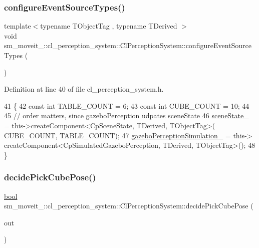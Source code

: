 \subsubsection{\texorpdfstring{configure\+Event\+Source\+Types()}{configureEventSourceTypes()}}
{\footnotesize\ttfamily template$<$typename T\+Object\+Tag , typename T\+Derived $>$ \\
void sm\+\_\+moveit\+\_\+::cl\+\_\+perception\+\_\+system\+::\+Cl\+Perception\+System\+::configure\+Event\+Source\+Types (\begin{DoxyParamCaption}{ }\end{DoxyParamCaption})\hspace{0.3cm}{\ttfamily [inline]}}



Definition at line 40 of file cl\+\_\+perception\+\_\+system.\+h.


\begin{DoxyCode}
41             \{
42                 \textcolor{keyword}{const} \textcolor{keywordtype}{int} TABLE\_COUNT = 6;
43                 \textcolor{keyword}{const} \textcolor{keywordtype}{int} CUBE\_COUNT = 10;
44 
45                 \textcolor{comment}{// order matters, since gazeboPerception udpates sceneState}
46                 \hyperlink{classsm__moveit__4_1_1cl__perception__system_1_1ClPerceptionSystem_a82ea8feeb2fa43349f91ed59137b3890}{sceneState\_} = this->createComponent<CpSceneState, TDerived, TObjectTag>(
      CUBE\_COUNT, TABLE\_COUNT);
47                 \hyperlink{classsm__moveit__4_1_1cl__perception__system_1_1ClPerceptionSystem_a027c07df3f1a2cc0c30be111b27dbe5c}{gazeboPerceptionSimulation\_} = this->
      createComponent<CpSimulatedGazeboPerception, TDerived, TObjectTag>();
48             \}
\end{DoxyCode}
\mbox{\label{classsm__moveit__4_1_1cl__perception__system_1_1ClPerceptionSystem_af1143d68db667021480383673244bb04}} 
\subsubsection{\texorpdfstring{decide\+Pick\+Cube\+Pose()}{decidePickCubePose()}}
{\footnotesize\ttfamily \hyperlink{classbool}{bool} sm\+\_\+moveit\+\_\+::cl\+\_\+perception\+\_\+system\+::\+Cl\+Perception\+System\+::decide\+Pick\+Cube\+Pose (\begin{DoxyParamCaption}\item[{geometry\+\_\+msgs\+::\+Pose\+Stamped \&}]{out }\end{DoxyParamCaption})\hspace{0.3cm}{\ttfamily [inline]}}



